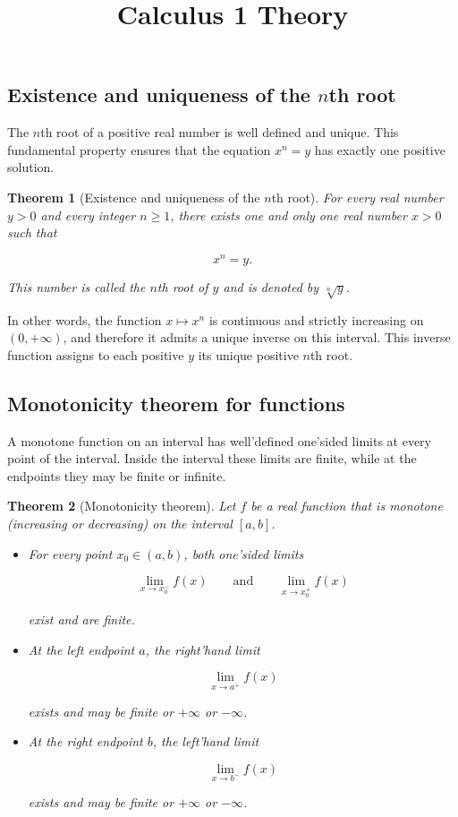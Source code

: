 \documentclass[11pt,a4paper]{article} \usepackage[T1]{fontenc}
\theoremstyle{plain} \newtheorem{theorem}{Theorem} \title{Calculus 1 Theory}
\begin{document}
\subsection{Existence and uniqueness of the $n$th root}

The $n$th root of a positive real number is well defined and unique. This
fundamental property ensures that the equation $x^n = y$ has exactly one
positive solution.

\begin{theorem}
[Existence and uniqueness of the $n$th root] For every real number $y>0$ and
every integer $n \ge 1$, there exists one and only one real number $x>0$ such
that

\[
x^n = y.
\]

This number is called the $n$th root of $y$ and is denoted by $\sqrt[n]{y}$.
\end{theorem}

In other words, the function $x \mapsto x^n$ is continuous and strictly
increasing on $(0,+\infty)$, and therefore it admits a unique inverse on this
interval. This inverse function assigns to each positive $y$ its unique
positive $n$th root.

\subsection{Monotonicity theorem for functions}

A monotone function on an interval has well’defined one’sided limits at every
point of the interval. Inside the interval these limits are finite, while at
the endpoints they may be finite or infinite.

\begin{theorem}
[Monotonicity theorem] Let $f$ be a real function that is monotone (increasing
or decreasing) on the interval $[a,b]$.

\begin{itemize}
\item For every point $x_0 \in (a,b)$, both one’sided limits

\[
\lim_{x \to x_0^-} f(x)
\qquad\text{and}\qquad
\lim_{x \to x_0^+} f(x)
\]

exist and are finite.
\item At the left endpoint $a$, the right’hand limit

\[
\lim_{x \to a^+} f(x)
\]

exists and may be finite or $+\infty$ or $-\infty$.
\item At the right endpoint $b$, the left’hand limit

\[
\lim_{x \to b^-} f(x)
\]

exists and may be finite or $+\infty$ or $-\infty$.
\end{itemize}

\end{theorem}
\end{document}
